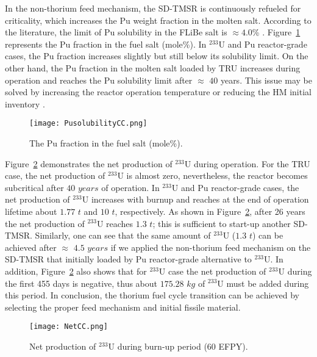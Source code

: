 In the non-thorium feed mechanism, the SD-TMSR is continuously refueled for 
criticality, which increases the Pu weight fraction in the molten salt. 
According to the literature, the limit of Pu solubility in the FLiBe salt is 
$\approx$$4.0$\% \cite{ignatiev2012progress,sood1975plutonium}. 
Figure~\ref{fig:PusolubilityCC} represents the Pu fraction in the fuel salt 
(mole\%). In $^{233}$U and Pu reactor-grade cases, the Pu fraction increases 
slightly but still below its solubility limit. On the other hand, the Pu 
fraction in the molten salt loaded by TRU increases during operation and 
reaches the Pu solubility limit after $\approx$ $40$ years. This issue may 
be solved by increasing the reactor operation temperature or reducing the 
HM initial inventory \cite{zou2018transition}.
\begin{figure}
	\centering
	\texttt{[image: PusolubilityCC.png]}
	\caption{The Pu fraction in the fuel salt (mole\%).}
	\label{fig:PusolubilityCC}
\end{figure}
\FloatBarrier

Figure~\ref{fig:NetCC} demonstrates the net production of $^{233}$U during 
operation. For the TRU case, the net production of $^{233}$U is almost 
zero, nevertheless, the reactor becomes subcritical after $40$ $years$ of 
operation. In $^{233}$U and Pu reactor-grade cases, the net production of 
$^{233}$U increases with burnup and reaches at the end of operation lifetime 
about $1.77$ $t$ and $10$ $t$, respectively. As shown in 
Figure~\ref{fig:NetCC}, after 26 years the net production of $^{233}$U reaches 
$1.3$ $t$; this is sufficient to start-up another \gls{SD-TMSR}. Similarly, 
one can see that the same amount of $^{233}$U ($1.3$ $t$) can be achieved 
after $\approx$ $4.5$ $years$ if we applied the non-thorium feed mechanism on 
the SD-TMSR that initially loaded by Pu reactor-grade alternative to 
$^{233}$U. In addition, Figure~\ref{fig:NetCC} also shows that for $^{233}$U 
case the net production of $^{233}$U during the first 455 days is negative, 
thus about $175.28$ $kg$ of $^{233}$U must be added during this period. In 
conclusion, the thorium fuel cycle transition can be achieved by selecting the 
proper feed mechanism and initial fissile material. 
\begin{figure}
	\centering
	\texttt{[image: NetCC.png]}
	\caption{Net production of $^{233}$U during burn-up period (60 \gls{EFPY}).}
	\label{fig:NetCC}
\end{figure}


